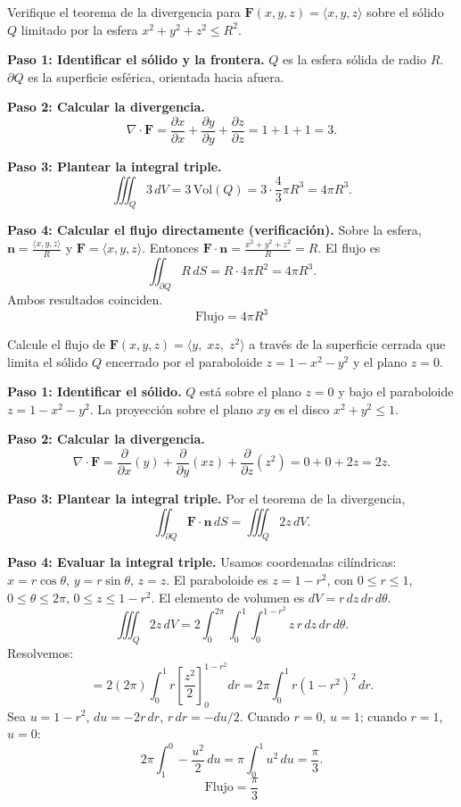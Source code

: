 \begin{example}
Verifique el teorema de la divergencia para $\mathbf{F}(x,y,z)=\langle x,y,z\rangle$ sobre el sólido $Q$ limitado por la esfera $x^2+y^2+z^2\le R^2$.
\begin{myproof}
\textbf{Paso 1: Identificar el sólido y la frontera.}
$Q$ es la esfera sólida de radio $R$. $\partial Q$ es la superficie esférica, orientada hacia afuera.

\textbf{Paso 2: Calcular la divergencia.}
\[
\nabla\cdot\mathbf{F} = \frac{\partial x}{\partial x}+\frac{\partial y}{\partial y}+\frac{\partial z}{\partial z} = 1+1+1=3.
\]

\textbf{Paso 3: Plantear la integral triple.}
\[
\iiint_Q 3\,dV = 3\,\text{Vol}(Q) = 3\cdot\frac{4}{3}\pi R^3 = 4\pi R^3.
\]

\textbf{Paso 4: Calcular el flujo directamente (verificación).}
Sobre la esfera, $\mathbf{n} = \frac{\langle x,y,z\rangle}{R}$ y $\mathbf{F}=\langle x,y,z\rangle$. Entonces $\mathbf{F}\cdot\mathbf{n} = \frac{x^2+y^2+z^2}{R} = R$. El flujo es
\[
\iint_{\partial Q} R\,dS = R\cdot 4\pi R^2 = 4\pi R^3.
\]
Ambos resultados coinciden.
\[
\boxed{\text{Flujo} = 4\pi R^3}
\]
\end{myproof}
\end{example}

\begin{example}
Calcule el flujo de $\mathbf{F}(x,y,z)=\langle y,\; xz,\; z^2\rangle$ a través de la superficie cerrada que limita el sólido $Q$ encerrado por el paraboloide $z=1-x^2-y^2$ y el plano $z=0$.
\begin{myproof}
\textbf{Paso 1: Identificar el sólido.}
$Q$ está sobre el plano $z=0$ y bajo el paraboloide $z=1-x^2-y^2$. La proyección sobre el plano $xy$ es el disco $x^2+y^2\le 1$.

\textbf{Paso 2: Calcular la divergencia.}
\[
\nabla\cdot\mathbf{F}
= \frac{\partial}{\partial x}(y) + \frac{\partial}{\partial y}(xz) + \frac{\partial}{\partial z}(z^2)
= 0 + 0 + 2z = 2z.
\]

\textbf{Paso 3: Plantear la integral triple.}
Por el teorema de la divergencia,
\[
\iint_{\partial Q}\mathbf{F}\cdot\mathbf{n}\,dS
= \iiint_Q 2z\,dV.
\]

\textbf{Paso 4: Evaluar la integral triple.}
Usamos coordenadas cilíndricas: $x=r\cos\theta$, $y=r\sin\theta$, $z=z$. El paraboloide es $z=1-r^2$, con $0\le r\le 1$, $0\le\theta\le 2\pi$, $0\le z\le 1-r^2$. El elemento de volumen es $dV = r\,dz\,dr\,d\theta$.
\[
\iiint_Q 2z\,dV
= 2\int_0^{2\pi}\int_0^1\int_0^{1-r^2} z\,r\,dz\,dr\,d\theta.
\]
Resolvemos:
\[
= 2(2\pi)\int_0^1 r\left[\frac{z^2}{2}\right]_0^{1-r^2} dr
= 2\pi\int_0^1 r(1-r^2)^2\,dr.
\]
Sea $u=1-r^2$, $du=-2r\,dr$, $r\,dr=-du/2$. Cuando $r=0$, $u=1$; cuando $r=1$, $u=0$:
\[
2\pi\int_1^0 -\frac{u^2}{2}\,du = \pi\int_0^1 u^2\,du = \frac{\pi}{3}.
\]
\[
\boxed{\text{Flujo} = \frac{\pi}{3}}
\]
\end{myproof}
\end{example}

